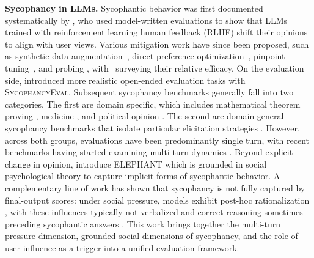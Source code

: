 \textbf{Sycophancy in LLMs.}
Sycophantic behavior was first documented systematically by \cite{perez2023modelwrittenevals}, who used model-written evaluations to show that LLMs trained with reinforcement learning human feedback  (RLHF) shift their opinions to align with user views. 
Various mitigation work have since been proposed, such as synthetic data augmentation~\cite{wei2023syntheticsycophancy}, direct preference optimization~\cite{khan2024mitigating}, pinpoint tuning~\cite{chen2024yes}, and probing \cite{papadatos2024probepenalty}, with~\cite{malmqvist2024sycophancymitigations} surveying their relative efficacy. 
On the evaluation side, \cite{sharma2023towards} introduced more realistic open-ended evaluation tasks with \textsc{SycophancyEval}. 
Subsequent sycophancy benchmarks generally fall into two categories. 
The first are domain specific, which includes mathematical theorem proving \cite{BROKENMATH}, medicine \cite{chen2025helpfulness}, and political opinion \cite{GermanPartiesQA}. 
The second are domain-general sycophancy benchmarks that isolate particular elicitation strategies \cite{SycEval, PARROT, BEACON, duffy2024sycobench}. 
However, across both groups, evaluations have been predominantly single turn, with recent benchmarks having started examining multi-turn dynamics \cite{TRUTHDECAY, FLIPFLOP, SYCONBENCH}. 
Beyond explicit change in opinion, \cite{ELEPHANT} introduce \textsc{ELEPHANT} which is grounded in social psychological theory to capture implicit forms of sycophantic behavior. 
A complementary line of work has shown that sycophancy is not fully captured by final-output scores: under social pressure, models exhibit post-hoc rationalization \cite{turpin2023languagemodels, turpin2023language, walden2026reasoning, chua2025reasoning}, with these influences typically not verbalized \cite{chua2025reasoning} and correct reasoning sometimes preceding sycophantic answers \cite{chang2026thermodynamic}.
This work brings together the multi-turn pressure dimension, grounded social dimensions of sycophancy, and the role of user influence as a trigger into a unified evaluation framework.

